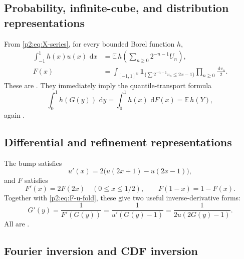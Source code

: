 \documentclass[11pt,oneside]{article}
\theoremstyle{definition}
\newcommand{\dd}{\,\mathrm d}
\newcommand{\E}{\mathbb E}
\newcommand{\N}{\mathbb N}
\begin{document}
\subsection{Probability, infinite-cube, and distribution representations}

From \eqref{p2:eq:X-series}, for every bounded Borel function $h$,
\begin{align}
 \int_{-1}^{1}h(x)u(x)\,\dd x
 &=\E\,h\!\left(\sum_{n\ge0}2^{-n-1}U_n\right),             \label{p2:eq:prob-test}\\
 F(x)
 &=\int_{[-1,1]^{\N}}\mathbf1_{\{\sum 2^{-n-1}v_n\le2x-1\}}
       \prod_{n\ge0}\frac{\dd v_n}{2}.                   \label{p2:eq:infinite-cube-F}
\end{align}
These are \statusknown.  They immediately imply the quantile-transport formula
\begin{equation}
 \int_0^1 h(G(y))\,\dd y
 =\int_0^1 h(x)\,\dd F(x)
 =\E\,h(Y),                                                \label{p2:eq:quantile-transport}
\end{equation}
again \statusknown.

\subsection{Differential and refinement representations}

The bump satisfies
\begin{equation}
 u'(x)=2\bigl(u(2x+1)-u(2x-1)\bigr),                        \label{p2:eq:u-DDE}
\end{equation}
and $F$ satisfies
\begin{equation}
 F'(x)=2F(2x)\quad(0\le x\le1/2),
 \qquad F(1-x)=1-F(x).                                     \label{p2:eq:F-DDE}
\end{equation}
Together with \eqref{p2:eq:F-u-fold}, these give two useful inverse-derivative
forms:
\begin{equation}
 G'(y)=\frac1{F'(G(y))}
 =\frac1{u'(G(y)-1)}
 =\frac1{2u(2G(y)-1)}.                                     \label{p2:eq:G-prime}
\end{equation}
All are \statusknown.

\subsection{Fourier inversion and CDF inversion}
\end{document}
